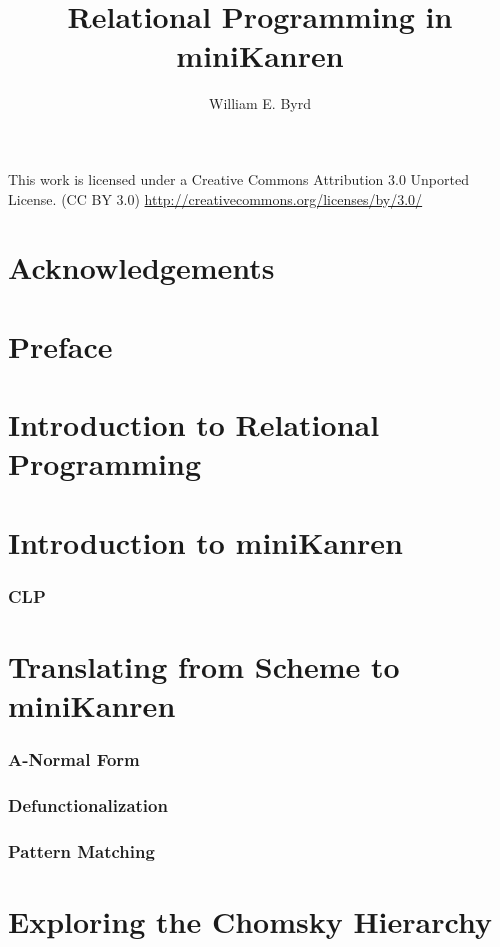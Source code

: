 \documentclass[11pt]{book}
\begin{document}
\begin{schemeregion}

\title{Relational Programming in miniKanren}
\author{William E. Byrd}
\maketitle
\tableofcontents

\newpage
\huge
\ccLogo
\ccAttribution
\large
This work is licensed under a Creative Commons Attribution 3.0 Unported License.
(CC BY 3.0) \url{http://creativecommons.org/licenses/by/3.0/}
\normalsize


\chapter{Acknowledgements}
\chapter{Preface}

\chapter{Introduction to Relational Programming}

\chapter{Introduction to miniKanren}
\subsection{CLP}

\chapter{Translating from Scheme to miniKanren}
\subsection{A-Normal Form}
\subsection{Defunctionalization}
\subsection{Pattern Matching}

\chapter{Exploring the Chomsky Hierarchy}

\end{schemeregion}
\end{document}
